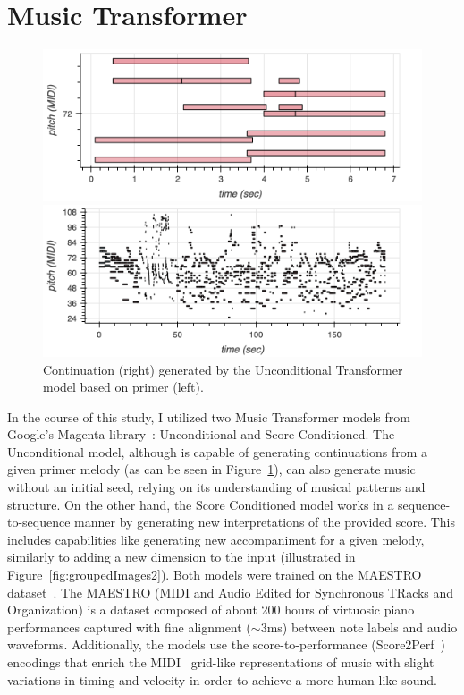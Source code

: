 \documentclass[twocolumn]{article}
\begin{document}
\section{Music Transformer}
\begin{figure}[htbp]
  \centering
  \begin{minipage}[t]{0.45\columnwidth}
    \centering
    \includegraphics[width=\linewidth]{images/primer.png}
  \end{minipage}\hfill
  \begin{minipage}[t]{0.45\columnwidth}
    \centering
    \includegraphics[width=\linewidth]{images/tf_continuation.png}
  \end{minipage}
  \caption{Continuation (right) generated by the Unconditional Transformer model based on primer (left).}
  \label{fig:groupedImages}
\end{figure}
In the course of this study, I utilized two Music Transformer models from Google's Magenta library~\cite{magenta}: Unconditional and Score Conditioned. The Unconditional model, although is capable of generating continuations from a given primer melody (as can be seen in Figure~\ref{fig:groupedImages}), can also generate music without an initial seed, relying on its understanding of musical patterns and structure. On the other hand, the Score Conditioned model works in a sequence-to-sequence manner by generating new interpretations of the provided score. This includes capabilities like generating new accompaniment for a given melody, similarly to adding a new dimension to the input (illustrated in Figure~\ref{fig:groupedImages2}). Both models were trained on the MAESTRO dataset~\cite{hawthorne2018enabling}. The MAESTRO (MIDI and Audio Edited for Synchronous TRacks and Organization) is a dataset composed of about 200 hours of virtuosic piano performances captured with fine alignment ($\sim3$ms) between note labels and audio waveforms. Additionally, the models use the score-to-performance (Score2Perf~\cite{score2perf}) encodings that enrich the MIDI~\cite{midi1996} grid-like representations of music with slight variations in timing and velocity in order to achieve a more human-like sound.
\end{document}
